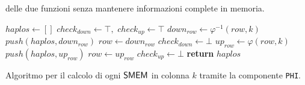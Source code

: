 delle due funzioni senza mantenere informazioni complete in memoria. 
\begin{algorithm}
  \small
  \begin{algorithmic}[1]
    \State $haplos\gets []$
    \State $check_{down}\gets \top,\,\,check_{up}\gets \top$
    \State $down_{row}\gets \varphi^{-1}(row, k)$
    \State $push(haplos, down_{row})$
    \State $row \gets down_{row}$
    \Else
    \State $check_{down}\gets \bot$
    \EndIf
    \EndWhile
    \State $up_{row}\gets \varphi(row, k)$
    \State $push(haplos, up_{row})$
    \State $row \gets up_{row}$
    \Else
    \State $check_{up}\gets \bot$
    \EndIf
    \EndWhile
    \State \textbf{return} $haplos$
    \EndFunction
  \end{algorithmic}
  \caption{\footnotesize{Algoritmo per il calcolo di ogni $\mbox{\rm {\sf SMEM}}$ in colonna $k$
  tramite la 
  componente \texttt{PHI}.}}
  \label{algo:phiext}
\end{algorithm}
